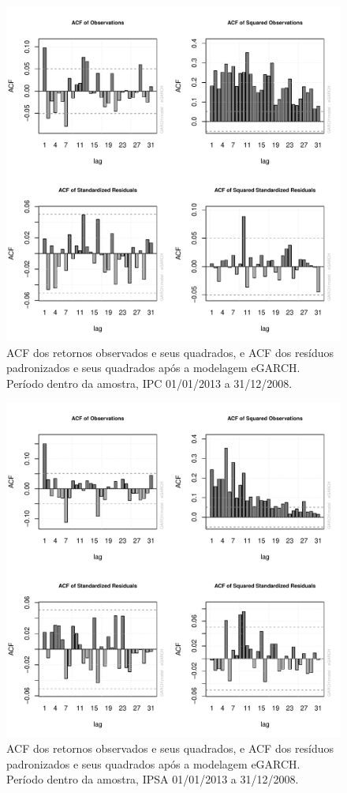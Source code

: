 \documentclass[review]{elsarticle}
\theoremstyle{definition}
\begin{document}
\begin{figure}[H]
	\centering
	\includegraphics[width=0.9\linewidth]{figs/artigo-acf-IPC}
	\caption{ACF dos retornos observados e seus quadrados, e ACF dos resíduos padronizados e seus quadrados após a modelagem eGARCH. Período dentro da amostra, IPC 01/01/2013 a 31/12/2008.}
	\label{fig:artigo-acf-ipc}
\end{figure}

\begin{figure}[H]
	\centering
	\includegraphics[width=0.9\linewidth]{figs/artigo-acf-IPSA}
	\caption{ACF dos retornos observados e seus quadrados, e ACF dos resíduos padronizados e seus quadrados após a modelagem eGARCH. Período dentro da amostra, IPSA 01/01/2013 a 31/12/2008.}
	\label{fig:artigo-acf-ipsa}
\end{figure}
\end{document}
